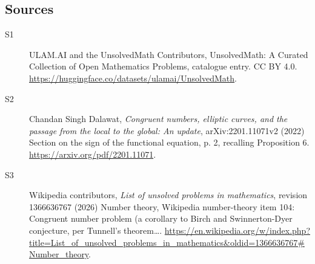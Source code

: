 \documentclass[11pt]{article}
\begin{document}
\subsection{Sources}
\begin{description}
\item[\hypertarget{source:statement:1}{S1}] ULAM.AI and the UnsolvedMath Contributors, UnsolvedMath: A Curated Collection of Open Mathematics Problems, catalogue entry. CC BY 4.0. \url{https://huggingface.co/datasets/ulamai/UnsolvedMath}.
\item[\hypertarget{source:statement:2}{S2}] Chandan Singh Dalawat, \emph{Congruent numbers, elliptic curves, and the passage from the local to the global: An update}, arXiv:2201.11071v2 (2022) Section on the sign of the functional equation, p. 2, recalling Proposition 6. \url{https://arxiv.org/pdf/2201.11071}.
\item[\hypertarget{source:statement:3}{S3}] Wikipedia contributors, \emph{List of unsolved problems in mathematics}, revision 1366636767 (2026) Number theory, Wikipedia number-theory item 104: Congruent number problem (a corollary to Birch and Swinnerton-Dyer conjecture, per Tunnell's theorem…. \url{https://en.wikipedia.org/w/index.php?title=List_of_unsolved_problems_in_mathematics&oldid=1366636767#Number_theory}.
\end{description}
\label{end:statement}
\end{document}
